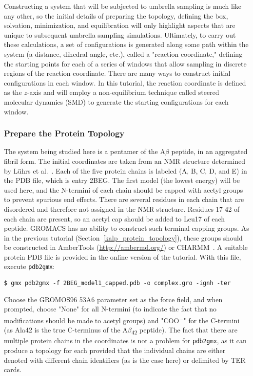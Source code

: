 \documentclass[9pt,tutorial,pubversion]{livecoms}
\begin{document}
Constructing a system that will be subjected to umbrella sampling is much like any other, so the initial details of preparing the topology, defining the box, solvation, minimization, and equilibration will only highlight aspects that are unique to subsequent umbrella sampling simulations. Ultimately, to carry out these calculations, a set of configurations is generated along some path within the system (a distance, dihedral angle, etc.), called a "reaction coordinate," defining the starting points for each of a series of windows that allow sampling in discrete regions of the reaction coordinate. There are many ways to construct initial configurations in each window. In this tutorial, the reaction coordinate is defined as the $z$-axis and will employ a non-equilibrium technique called steered molecular dynamics (SMD) to generate the starting configurations for each window.

\subsubsection{Prepare the Protein Topology} \label{umbrella_protein_topology}

The system being studied here is a pentamer of the A$\beta$ peptide, in an aggregated fibril form. The initial coordinates are taken from an NMR structure determined by L\"uhrs et al.~\cite{Luhrs2005}. Each of the five protein chains is labeled (A, B, C, D, and E) in the PDB file, which is entry 2BEG. The first model (the lowest energy) will be used here, and the N-termini of each chain should be capped with acetyl groups to prevent spurious end effects. There are several residues in each chain that are disordered and therefore not assigned in the NMR structure. Residues 17-42 of each chain are present, so an acetyl cap should be added to Leu17 of each peptide. GROMACS has no ability to construct such terminal capping groups. As in the previous tutorial (Section~\ref{kalp_protein_topology}), these groups should be constructed in AmberTools (\url{http://ambermd.org/}) or CHARMM~\cite{Brooks2009}. A suitable protein PDB file is provided in the online version of the tutorial. With this file, execute \texttt{pdb2gmx}:

\begin{lstlisting}
$ gmx pdb2gmx -f 2BEG_model1_capped.pdb -o complex.gro -ignh -ter
\end{lstlisting}
%
Choose the GROMOS96 53A6 parameter set as the force field, and when prompted, choose "None" for all N-termini (to indicate the fact that no modifications should be made to acetyl groups) and "COO\textsuperscript{$-$}" for the C-termini (as Ala42 is the true C-terminus of the A$\beta$\textsubscript{42} peptide). The fact that there are multiple protein chains in the coordinates is not a problem for \texttt{pdb2gmx}, as it can produce a topology for each provided that the individual chains are either denoted with different chain identifiers (as is the case here) or delimited by TER cards.
\end{document}
